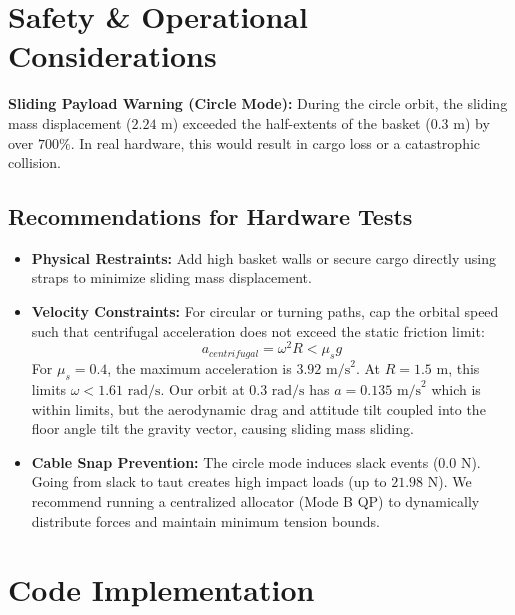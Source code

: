 \documentclass[11pt,a4paper]{article}
\begin{document}
\newpage
\section{Safety \& Operational Considerations}

\begin{alertbox}
    \textbf{Sliding Payload Warning (Circle Mode):} During the circle orbit, the sliding mass displacement ($2.24$ m) exceeded the half-extents of the basket ($0.3$ m) by over $700\%$. In real hardware, this would result in cargo loss or a catastrophic collision.
\end{alertbox}

\subsection{Recommendations for Hardware Tests}
\begin{itemize}
    \item \textbf{Physical Restraints:} Add high basket walls or secure cargo directly using straps to minimize sliding mass displacement.
    \item \textbf{Velocity Constraints:} For circular or turning paths, cap the orbital speed such that centrifugal acceleration does not exceed the static friction limit:
    \begin{equation}
        a_{centrifugal} = \omega^2 R < \mu_s g
    \end{equation}
    For $\mu_s = 0.4$, the maximum acceleration is $3.92\text{ m/s}^2$. At $R=1.5$ m, this limits $\omega < 1.61\text{ rad/s}$. Our orbit at $0.3\text{ rad/s}$ has $a = 0.135\text{ m/s}^2$ which is within limits, but the aerodynamic drag and attitude tilt coupled into the floor angle tilt the gravity vector, causing sliding mass sliding.
    \item \textbf{Cable Snap Prevention:} The circle mode induces slack events ($0.0$ N). Going from slack to taut creates high impact loads (up to $21.98$ N). We recommend running a centralized allocator (Mode B QP) to dynamically distribute forces and maintain minimum tension bounds.
\end{itemize}

\newpage
\section{Code Implementation}
\end{document}
